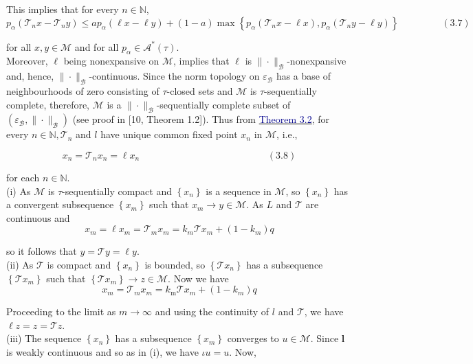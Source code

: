 \documentclass[12pt,a4paper,two side]{article}
\begin{document}
This implies that for every $n \in \mathbb{N}$,
$$
p_\alpha\left(\mathcal{T}_n x-\mathcal{T}_n y\right) \leq a p_\alpha(\ell x-\ell y)+(1-a) \max \left\{p_\alpha\left(\mathcal{T}_n x-\ell x\right), p_\alpha\left(\mathcal{T}_n y-\ell y\right)\right\} \ \ \ \ \ \ \ \ \ \  \ \ \ \ \ \ \ \ \ \ (3.7)
$$

for all $x, y \in \mathcal{M}$ and for all $p_\alpha \in \mathcal{A}^*(\tau)$.\\

Moreover, $\ell$ being nonexpansive on $\mathcal{M}$, implies that $\ell$ is $\|\cdot\|_{\mathscr{B}}$-nonexpansive and, hence, $\|\cdot\|_{\mathscr{B}}$-continuous. Since the norm topology on $\varepsilon_{\mathscr{B}}$ has a base of neighbourhoods of zero consisting of $\tau$-closed sets and $\mathcal{M}$ is $\tau$-sequentially complete, therefore, $\mathcal{M}$ is a $\|\cdot\|_{\mathscr{B}}$-sequentially complete subset of $\left(\varepsilon_{\mathcal{B}},\|\cdot\|_{\mathscr{B}}\right)$ (see proof in [10, Theorem 1.2]). Thus from \hyperlink{muc3.2}{\textcolor{Darkblue}{Theorem 3.2}}, for every $n \in \mathbb{N}, \mathcal{T}_n$ and $l$ have unique common fixed point $x_n$ in $\mathcal{M}$, i.e.,

$$
x_n=\mathcal{T}_n x_n=\ell x_n \ \ \ \ \ \ \ \ \ \  \ \ \ \ \ \ \ \ \ \ \ \ \ \ \ \ \ \ \ \ \ \ \ \ \ \ \ \ \ \ \ \ \ \ \ \ \ \ \ \  \ \ \ \ \ \ \ \ \ \ (3.8)
$$

for each $n \in \mathbb{N}$.\\
(i) As $\mathcal{M}$ is $\tau$-sequentially compact and $\left\{x_n\right\}$ is a sequence in $\mathcal{M}$, so $\left\{x_n\right\}$ has a convergent subsequence $\left\{x_m\right\}$ such that $x_m \rightarrow y \in \mathcal{M}$. As $L$ and $\mathcal{T}$ are continuous and\\
$$
x_m=\ell x_m=\mathcal{T}_m x_m=k_m \mathcal{T} x_m+\left(1-k_m\right) q
$$

so it follows that $y=\mathcal{T} y=\ell y$.\\
(ii) As $\mathcal{T}$ is compact and $\left\{x_n\right\}$ is bounded, so $\left\{\mathcal{T} x_n\right\}$ has a subsequence $\left\{\mathcal{T} x_m\right\}$ such that $\left\{\mathcal{T} x_m\right\} \rightarrow z \in \mathcal{M}$. Now we have\\
$$
x_m=\mathcal{T}_m x_m=k_{\mathrm{m}} \mathcal{T} x_m+\left(1-k_m\right) q
$$

Proceeding to the limit as $m \rightarrow \infty$ and using the continuity of $l$ and $\mathcal{T}$, we have $\ell z=z=\mathcal{T} z$.\\
(iii) The sequence $\left\{x_n\right\}$ has a subsequence $\left\{x_m\right\}$ converges to $u \in \mathcal{M}$. Since $\boldsymbol{l}$ is weakly continuous and so as in (i), we have $\iota u=u$. Now,
\end{document}
